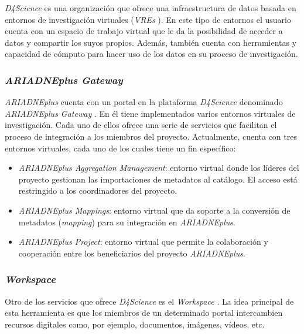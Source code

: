 \emph{D4Science} \cite{dfour:web}
es una organización que ofrece una infraestructura de datos basada en
entornos de investigación virtuales (\emph{VREs} \cite{art:vre}). En este tipo de entornos el usuario cuenta con un espacio de trabajo virtual que le da la posibilidad de acceder a datos y compartir los suyos propios. Además, también cuenta con herramientas y capacidad de cómputo
para hacer uso de los datos en su proceso de investigación.


\subsubsection{\emph{ARIADNEplus Gateway}}

\emph{ARIADNEplus} cuenta con un portal en la plataforma
\emph{D4Science} denominado \emph{ARIADNEplus Gateway} \cite{aplusgat:web}. En él tiene
implementados varios entornos virtuales de investigación.
Cada uno de ellos ofrece una serie de servicios que facilitan el proceso
de integración a los miembros del proyecto. Actualmente, cuenta con tres
entornos virtuales, cada uno de los cuales tiene un fin específico:


\begin{itemize}
\tightlist
\item
  \emph{ARIADNEplus Aggregation Management}: entorno virtual donde
  los líderes del proyecto gestionan las importaciones de metadatos al
  catálogo. El acceso está restringido a los coordinadores del proyecto.
\item
  \emph{ARIADNEplus Mappings}: entorno virtual que da soporte a la
  conversión de metadatos (\emph{mapping}) para su integración en
  \emph{ARIADNEplus}.
\item
  \emph{ARIADNEplus Project}: entorno virtual que permite la
  colaboración y cooperación entre los beneficiarios del proyecto
  \emph{ARIADNEplus}.
\end{itemize}

\subsubsection{\emph{Workspace}}

Otro de los servicios que ofrece \emph{D4Science} es el
\emph{Workspace} \cite{dfourwork:web}. La idea principal de esta herramienta es que los
miembros de un determinado portal intercambien recursos digitales como,
por ejemplo, documentos, imágenes, vídeos, etc.

